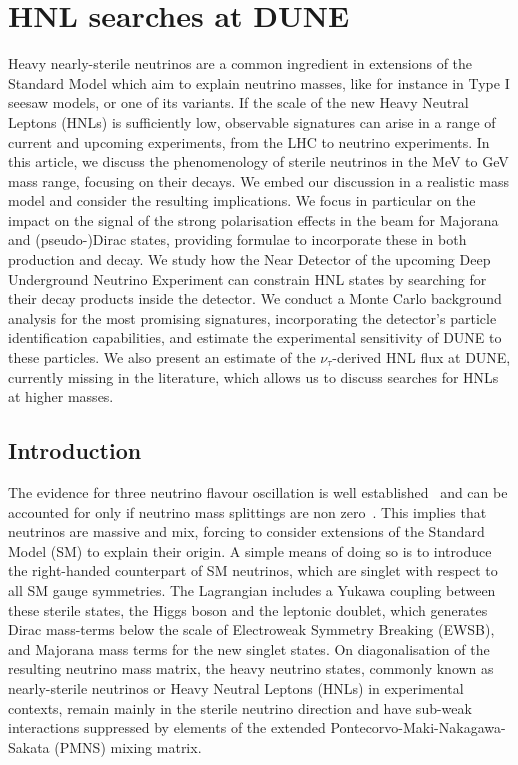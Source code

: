 \clearpage
\chapter{HNL searches at DUNE}

Heavy nearly-sterile neutrinos are a common ingredient in extensions of the
Standard Model which aim to explain neutrino masses, like for instance in Type I
seesaw models, or one of its variants. If the scale of the new Heavy Neutral Leptons (HNLs) is sufficiently low, 
observable signatures can arise in a range of current and upcoming experiments, from the LHC to neutrino experiments.
%
In this article, we discuss the phenomenology of sterile neutrinos in the MeV to GeV mass range, focusing on their decays. We embed our discussion in a realistic mass model and consider the resulting implications.
%
We focus in particular on the impact on the signal of the strong polarisation
effects in the beam for Majorana and \mbox{(pseudo-)Dirac} states, providing formulae 
to incorporate these in both production and decay.
%
We study how the Near Detector of the upcoming Deep Underground Neutrino
Experiment can constrain HNL states by searching for their decay products inside the detector.
%
We conduct a Monte Carlo background analysis for the most promising
signatures, incorporating the detector's particle identification capabilities,
and estimate the experimental sensitivity of DUNE to these particles.  
%
We also present an estimate of the \mbox{$\nu_\tau$-derived} HNL flux at DUNE, 
currently missing in the literature, which allows us to discuss searches for 
HNLs at higher masses.  
%
 

\section{Introduction}
\label{sec:introduction}

The evidence for three neutrino flavour oscillation is well established~\cite{Fukuda:1998mi,Aharmim:2005gt} %
and can be accounted for only if neutrino mass splittings are non zero~\cite{nufit}.
This implies that neutrinos are massive and mix, forcing to consider extensions %
of the Standard Model (SM) to explain their origin. 
A simple means of doing so is to introduce the right-handed counterpart of SM neutrinos, which are %
singlet with respect to all SM gauge symmetries.
The Lagrangian includes a Yukawa coupling between these sterile states, the Higgs boson and the leptonic doublet, %
which generates Dirac mass-terms below the scale of Electroweak Symmetry Breaking (EWSB), 
and Majorana mass terms for the new singlet states.
On diagonalisation of the resulting neutrino mass matrix, the heavy neutrino states, %
commonly known as nearly-sterile neutrinos or Heavy Neutral Leptons (HNLs) in experimental contexts, %
remain mainly in the sterile neutrino direction and have sub-weak interactions suppressed by %
elements of the extended Pontecorvo-Maki-Nakagawa-Sakata (PMNS) mixing matrix. 

